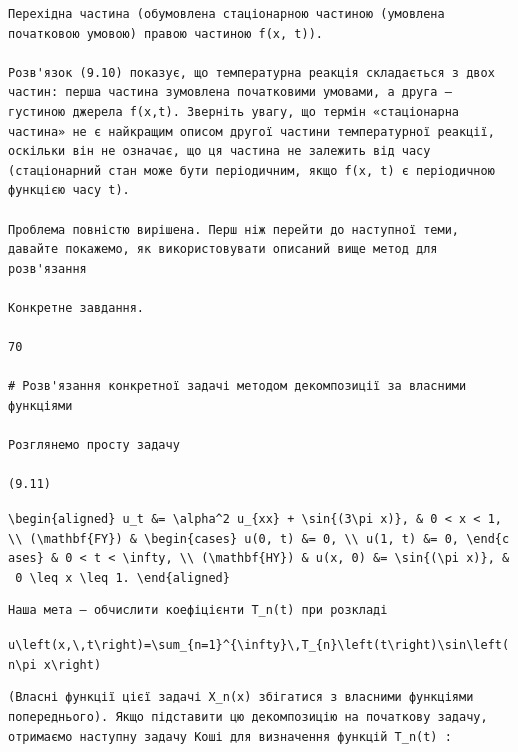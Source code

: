 \documentclass[
  ukrainian,
]{article}
\begin{document}
\begin{verbatim}
Перехідна частина (обумовлена стаціонарною частиною (умовлена початковою умовою) правою частиною f(x, t)).

Розв'язок (9.10) показує, що температурна реакція складається з двох частин: перша частина зумовлена початковими умовами, а друга — густиною джерела f(x,t). Зверніть увагу, що термін «стаціонарна частина» не є найкращим описом другої частини температурної реакції, оскільки він не означає, що ця частина не залежить від часу (стаціонарний стан може бути періодичним, якщо f(x, t) є періодичною функцією часу t).

Проблема повністю вирішена. Перш ніж перейти до наступної теми, давайте покажемо, як використовувати описаний вище метод для розв'язання

Конкретне завдання.

70

# Розв'язання конкретної задачі методом декомпозиції за власними функціями

Розглянемо просту задачу

(9.11)
\end{verbatim}

\texttt{\textbackslash{}begin\{aligned\}\ u\_t\ \&=\ \textbackslash{}alpha\^{}2\ u\_\{xx\}\ +\ \textbackslash{}sin\{(3\textbackslash{}pi\ x)\},\ \&\ 0\ \textless{}\ x\ \textless{}\ 1,\ \textbackslash{}\textbackslash{}\ (\textbackslash{}mathbf\{FY\})\ \&\ \textbackslash{}begin\{cases\}\ u(0,\ t)\ \&=\ 0,\ \textbackslash{}\textbackslash{}\ u(1,\ t)\ \&=\ 0,\ \textbackslash{}end\{cases\}\ \&\ 0\ \textless{}\ t\ \textless{}\ \textbackslash{}infty,\ \textbackslash{}\textbackslash{}\ (\textbackslash{}mathbf\{HY\})\ \&\ u(x,\ 0)\ \&=\ \textbackslash{}sin\{(\textbackslash{}pi\ x)\},\ \&\ 0\ \textbackslash{}leq\ x\ \textbackslash{}leq\ 1.\ \textbackslash{}end\{aligned\}}

\begin{verbatim}
Наша мета — обчислити коефіцієнти T_n(t) при розкладі
\end{verbatim}

\texttt{u\textbackslash{}left(x,\textbackslash{},t\textbackslash{}right)=\textbackslash{}sum\_\{n=1\}\^{}\{\textbackslash{}infty\}\textbackslash{},T\_\{n\}\textbackslash{}left(t\textbackslash{}right)\textbackslash{}sin\textbackslash{}left(n\textbackslash{}pi\ x\textbackslash{}right)}

\begin{verbatim}
(Власні функції цієї задачі X_n(x) збігатися з власними функціями попереднього). Якщо підставити цю декомпозицію на початкову задачу, отримаємо наступну задачу Коші для визначення функцій T_n(t) :
\end{verbatim}
\end{document}
